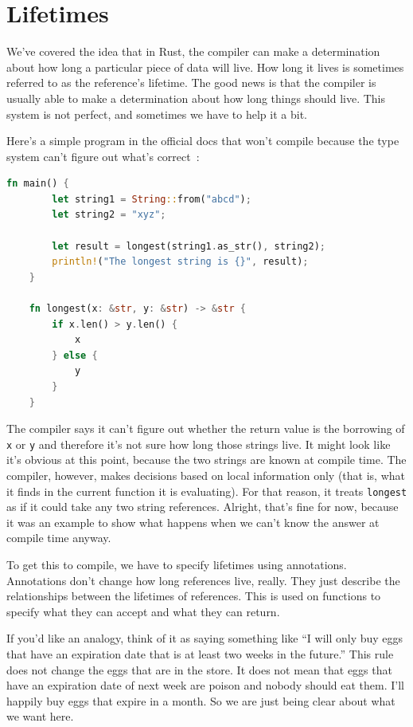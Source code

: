 \section*{Lifetimes}
We've covered the idea that in Rust, the compiler can make a determination about how long a particular piece of data will live. How long it lives is sometimes referred to as the reference's lifetime. The good news is that the compiler is usually able to make a determination about how long things should live. This system is not perfect, and sometimes we have to help it a bit.

Here's a simple program in the official docs that won't compile because the type system can't figure out what's correct~\cite{rustdocs}:

\begin{lstlisting}[language=Rust]
    fn main() {
        let string1 = String::from("abcd");
        let string2 = "xyz";

        let result = longest(string1.as_str(), string2);
        println!("The longest string is {}", result);
    }

    fn longest(x: &str, y: &str) -> &str {
        if x.len() > y.len() {
            x
        } else {
            y
        }
    }
\end{lstlisting}

The compiler says it can't figure out whether the return value is the borrowing of \texttt{x} or \texttt{y} and therefore it's not sure how long those strings live. It might look like it's obvious at this point, because the two strings are known at compile time. The compiler, however, makes decisions based on local information only (that is, what it finds in the current function it is evaluating). For that reason, it treats \texttt{longest} as if it could take any two string references. Alright, that's fine for now, because it was an example to show what happens when we can't know the answer at compile time anyway.

To get this to compile, we have to specify lifetimes using annotations. Annotations don't change how long references live, really. They just describe the relationships between the lifetimes of references. This is used on functions to specify what they can accept and what they can return.

If you'd like an analogy, think of it as saying something like ``I will only buy eggs that have an expiration date that is at least two weeks in the future.'' This rule does not change the eggs that are in the store. It does not mean that eggs that have an expiration date of next week are poison and nobody should eat them. I'll happily buy eggs that expire in a month. So we are just being clear about what we want here.

